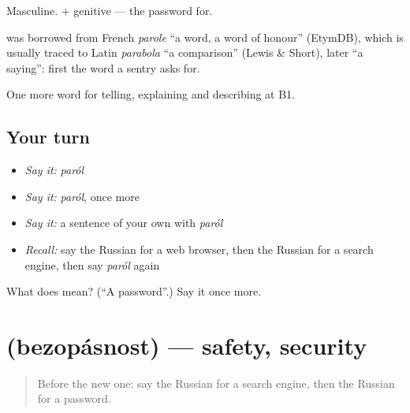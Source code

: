 Masculine. \emph{ } + genitive — the password for.

\begin{cousinweb}
\textbf{} was borrowed from French \emph{parole} \textquotedblleft{}a word, a word of honour\textquotedblright{} (EtymDB), which is usually traced to Latin \emph{parabola} \textquotedblleft{}a comparison\textquotedblright{} (Lewis \& Short), later \textquotedblleft{}a saying\textquotedblright{}: first the word a sentry asks for.
\end{cousinweb}

\begin{grammarlens}[title={What you've built}]
One more word for telling, explaining and describing at B1.
\end{grammarlens}

\subsection*{Your turn}
\begin{itemize}
\raggedright
  \item \emph{Say it:} \emph{paról}
  \item \emph{Say it:} \emph{paról}, once more
  \item \emph{Say it:} a sentence of your own with \emph{paról}
  \item \emph{Recall:} say the Russian for a web browser, then the Russian for a search engine, then say \emph{paról} again
\end{itemize}

\begin{tcolorbox}[breakable,colback=teal!4,colframe=teal!35!black,title={Before you move on}]
What does  mean? (\textquotedblleft{}A password\textquotedblright{}.) Say it once more.
\end{tcolorbox}
\section[\texorpdfstring{\ru{безопасность} (bezopásnost)}{безопасность (bezopásnost)}]{ (bezopásnost) — safety, security}

\label{lesson:RU-C400-bezopasnost}



\begin{quote}
Before the new one: say the Russian for a search engine, then the Russian for a password.
\end{quote}

